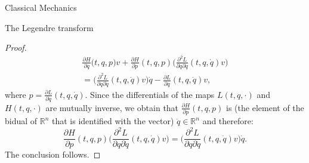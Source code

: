 \documentclass[oneside,a4paper,11pt]{amsbook}
\newcommand{\R}{\mathds R}
\theoremstyle{remark}\newtheorem{exercise}{Exercise}[chapter]
\theoremstyle{plain}\newtheorem{teo}{Theorem}[section]
\theoremstyle{plain}\newtheorem{lem}[teo]{Lemma}
\theoremstyle{plain}\newtheorem{prop}[teo]{Proposition}
\theoremstyle{plain}\newtheorem{cor}[teo]{Corollary}
\theoremstyle{definition}\newtheorem{defin}[teo]{Definition}
\theoremstyle{remark}\newtheorem{rem}[teo]{Remark}
\theoremstyle{definition}\newtheorem{notation}[teo]{Notation}
\theoremstyle{definition}\newtheorem{convention}[teo]{Convention}
\theoremstyle{definition}\newtheorem{example}[teo]{Example}
\numberwithin{section}{chapter}
\numberwithin{equation}{section}
\begin{document}
\begin{chapter}{Classical Mechanics}
\begin{section}{The Legendre transform}
\begin{proof}
\begin{multline*}
\frac{\partial H}{\partial q}\big(t,q,p)v
+\frac{\partial H}{\partial p}(t,q,p)\Big(\frac{\partial^2L}{\partial q\partial\dot q}(t,q,\dot q)v\Big)\\
=\Big(\frac{\partial^2L}{\partial q\partial\dot q}(t,q,\dot q)v\Big)\dot q
-\frac{\partial L}{\partial q}(t,q,\dot q)v,
\end{multline*}
where $p=\frac{\partial L}{\partial\dot q}(t,q,\dot q)$. Since the differentials of the maps
$L(t,q,\cdot)$ and $H(t,q,\cdot)$ are mutually inverse, we obtain that $\frac{\partial H}{\partial p}(t,q,p)$
is (the element of the bidual of $\R^n$ that is identified with the vector) $\dot q\in\R^n$ and therefore:
\[\frac{\partial H}{\partial p}(t,q,p)\Big(\frac{\partial^2L}{\partial q\partial\dot q}(t,q,\dot q)v\Big)
=\Big(\frac{\partial^2L}{\partial q\partial\dot q}(t,q,\dot q)v\Big)\dot q.\]
The conclusion follows.
\end{proof}


\end{section}
\end{chapter}
\end{document}

